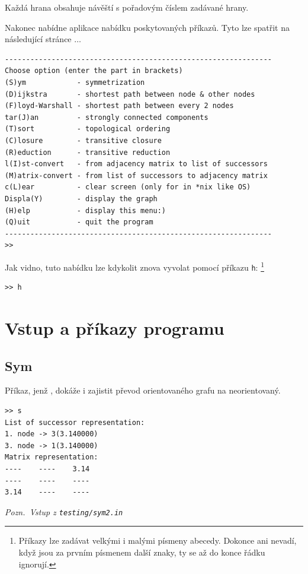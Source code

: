 \documentclass[11pt,a4paper]{article}
\begin{document}
Každá hrana obsahuje návěští s pořadovým číslem zadávané hrany.

Nakonec nabídne aplikace nabídku poskytovaných příkazů.
Tyto lze spatřit na následující stránce $\dots$

\vfill\eject

\begin{verbatim}
---------------------------------------------------------------
Choose option (enter the part in brackets)
(S)ym            - symmetrization
(D)ijkstra       - shortest path between node & other nodes
(F)loyd-Warshall - shortest path between every 2 nodes
tar(J)an         - strongly connected components
(T)sort          - topological ordering
(C)losure        - transitive closure
(R)eduction      - transitive reduction
l(I)st-convert   - from adjacency matrix to list of successors
(M)atrix-convert - from list of successors to adjacency matrix
c(L)ear          - clear screen (only for in *nix like OS) 
Displa(Y)        - display the graph 
(H)elp           - display this menu:) 
(Q)uit           - quit the program 
---------------------------------------------------------------
>>
\end{verbatim}

Jak vidno, tuto nabídku lze kdykolit znova vyvolat pomocí
příkazu {\tt h}:%
\footnote{Příkazy lze zadávat velkými i malými písmeny abecedy.
Dokonce ani nevadí, když jsou za prvním písmenem další znaky, ty se až do konce
  řádku ignorují.}

\begin{verbatim}
>> h 
\end{verbatim}

\section{Vstup a příkazy programu}
\subsection{Sym}
Příkaz, jenž , dokáže i zajistit
převod orientovaného grafu na neorientovaný.

\begin{verbatim}
>> s
List of successor representation:
1. node -> 3(3.140000)
3. node -> 1(3.140000)
Matrix representation:
----    ----    3.14
----    ----    ----
3.14    ----    ----
\end{verbatim}

{\noindent \sl Pozn.~Vstup z \tt testing/sym2.in}
\end{document}
